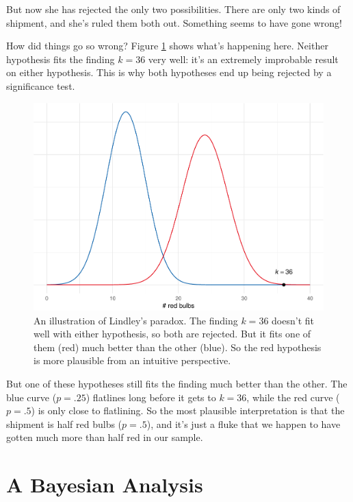 \documentclass[justified]{tufte-book}
\theoremstyle{definition}
\theoremstyle{definition}
\theoremstyle{definition}
\theoremstyle{remark}
\begin{document}
But now she has rejected the only two possibilities. There are only two
kinds of shipment, and she's ruled them both out. Something seems to
have gone wrong!

How did things go so wrong? Figure \ref{fig:lindley} shows what's
happening here. Neither hypothesis fits the finding \(k = 36\) very
well: it's an extremely improbable result on either hypothesis. This is
why both hypotheses end up being rejected by a significance test.

\begin{figure}
\includegraphics{_main_files/figure-latex/lindley-1} \caption[An illustration of Lindley's paradox]{An illustration of Lindley's paradox. The finding $k = 36$ doesn't fit well with either hypothesis, so both are rejected. But it fits one of them (red) much better than the other (blue). So the red hypothesis is more plausible from an intuitive perspective.}\label{fig:lindley}
\end{figure}

But one of these hypotheses still fits the finding much better than the
other. The blue curve (\(p = .25\)) flatlines long before it gets to
\(k = 36\), while the red curve (\(p = .5\)) is only close to
flatlining. So the most plausible interpretation is that the shipment is
half red bulbs (\(p = .5\)), and it's just a fluke that we happen to
have gotten much more than half red in our sample.

\hypertarget{a-bayesian-analysis}{%
\section{A Bayesian Analysis}\label{a-bayesian-analysis}}
\end{document}
